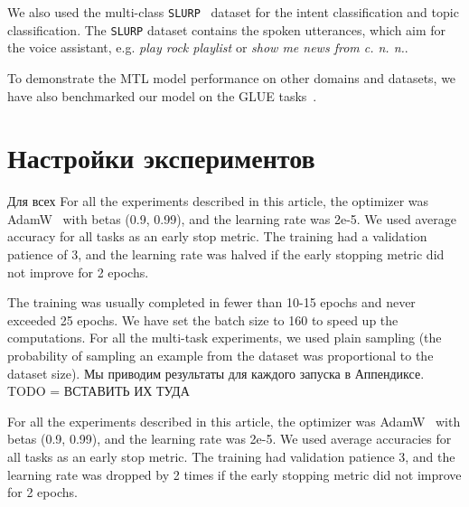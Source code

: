 We also used the multi-class \texttt{SLURP}~\cite{slurp} dataset for the intent classification and topic classification. The \texttt{SLURP} dataset contains the spoken utterances, which aim for the voice assistant, e.g. \textit{play rock playlist} or \textit{show me news from c. n. n.}.

To demonstrate the MTL model performance on other domains and datasets, we have also benchmarked our model on the GLUE tasks~\cite{GLUE:19}.
\section {Настройки экспериментов}

Для всех 
For all the experiments described in this article, the optimizer was AdamW~\cite{adam} with betas (0.9, 0.99), and the learning rate was 2e-5.%
We used average accuracy for all tasks as an early stop metric. The training had a validation patience of 3, and the learning rate was halved if the early stopping metric did not improve for 2 epochs. 

The training was usually completed in fewer than 10-15 epochs and never exceeded 25 epochs.%
We have set the batch size to 160 to speed up the computations. For all the multi-task experiments, we used plain sampling (the probability of sampling an example from the dataset was proportional to the dataset size). 
Мы приводим результаты для каждого запуска в Аппендиксе. TODO = ВСТАВИТЬ ИХ ТУДА


For all the experiments described in this article, the optimizer was AdamW~\cite{adam} with betas (0.9, 0.99), and the learning rate was 2e-5. 
We used average accuracies for all tasks as an early stop metric. The training had validation patience 3, and the learning rate was dropped by 2 times if the early stopping metric did not improve for 2 epochs. 

